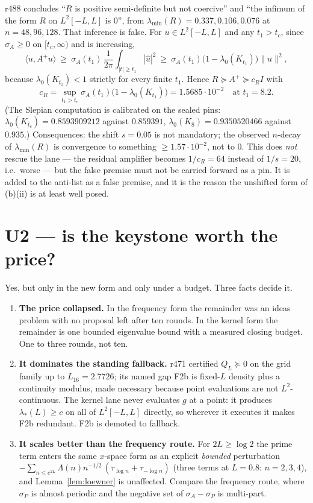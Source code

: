 \documentclass[11pt]{article}
\theoremstyle{remark}
\begin{document}
r488 concludes ``$R$ is positive semi-definite but not
coercive'' and ``the infimum of the form $R$ on $L^2[-L,L]$ is
$0$'', from $\lambda_{\min}(R)=0.337,0.106,0.076$ at
$n=48,96,128$.  That inference is false.
For $u\in L^2[-L,L]$ and any $t_1>t_c$, since $\sigma_A\ge0$
on $[t_c,\infty)$ and is increasing,
\[
  \langle u,A^+u\rangle
  \ \ge\ \sigma_A(t_1)\,\frac{1}{2\pi}\int_{|t|\ge t_1}|\hat u|^2
  \ \ge\ \sigma_A(t_1)\big(1-\lambda_0(K_{t_1})\big)\|u\|^2 ,
\]
because $\lambda_0(K_{t_1})<1$ strictly for every finite $t_1$.
Hence $R\succeq A^+\succeq c_R I$ with
\[
  c_R=\sup_{t_1>t_c}\sigma_A(t_1)\big(1-\lambda_0(K_{t_1})\big)
  =1.5685\cdot10^{-2}\quad\text{at }t_1=8.2 .
\]
(The Slepian computation is calibrated on the sealed pins:
$\lambda_0(K_{t_c})=0.8593909212$ against $0.859391$,
$\lambda_0(K_8)=0.9350520466$ against $0.935$.)
Consequences:
the shift $s=0.05$ is not mandatory;
the observed $n$-decay of $\lambda_{\min}(R)$ is convergence to
something $\ge1.57\cdot10^{-2}$, not to $0$.
This does \emph{not} rescue the lane --- the residual amplifier
becomes $1/c_R=64$ instead of $1/s=20$, i.e.\ worse --- but the
false premise must not be carried forward as a pin.
It is added to the anti-list as a false premise, and it is the
reason the unshifted form of (b)(ii) is at least well posed.

\section{U2 --- is the keystone worth the price?}

Yes, but only in the new form and only under a budget.
Three facts decide it.

\begin{enumerate}
\item \textbf{The price collapsed.}  In the frequency form the
remainder was an ideas problem with no proposal left after ten
rounds.  In the kernel form the remainder is one bounded
eigenvalue bound with a measured closing budget.  One to three
rounds, not ten.
\item \textbf{It dominates the standing fallback.}  r471
certified $Q_L\succeq0$ on the grid family up to
$L_{16}=2.7726$; its named gap F2b is fixed-$L$ density plus a
continuity modulus, made necessary because point evaluations
are not $L^2$-continuous.  The kernel lane never evaluates $g$
at a point: it produces $\lambda_*(L)\ge c$ on all of
$L^2[-L,L]$ directly, so wherever it executes it makes F2b
redundant.  F2b is demoted to fallback.
\item \textbf{It scales better than the frequency route.}
For $2L\ge\log2$ the prime term enters the same $x$-space form
as an explicit \emph{bounded} perturbation
$-\sum_{n\le e^{2L}}\Lambda(n)n^{-1/2}\,(\tau_{\log n}
+\tau_{-\log n})$
(three terms at $L=0.8$: $n=2,3,4$), and
Lemma~\ref{lem:loewner} is unaffected.
Compare the frequency route, where $\sigma_P$ is almost
periodic and the negative set of $\sigma_A-\sigma_P$ is
multi-part.
\end{enumerate}
\end{document}
